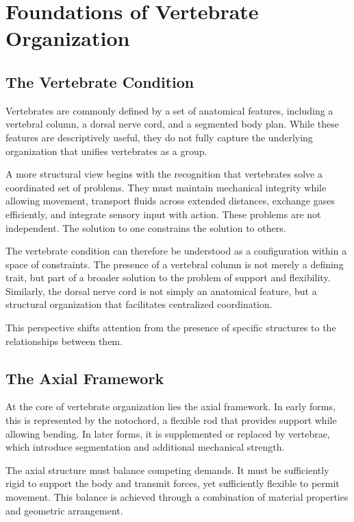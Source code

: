 \documentclass[11pt,oneside]{book}
\begin{document}
\mainmatter

\chapter{Foundations of Vertebrate Organization}

\section{The Vertebrate Condition}

Vertebrates are commonly defined by a set of anatomical features, including a vertebral column, a dorsal nerve cord, and a segmented body plan. While these features are descriptively useful, they do not fully capture the underlying organization that unifies vertebrates as a group.

A more structural view begins with the recognition that vertebrates solve a coordinated set of problems. They must maintain mechanical integrity while allowing movement, transport fluids across extended distances, exchange gases efficiently, and integrate sensory input with action. These problems are not independent. The solution to one constrains the solution to others.

The vertebrate condition can therefore be understood as a configuration within a space of constraints. The presence of a vertebral column is not merely a defining trait, but part of a broader solution to the problem of support and flexibility. Similarly, the dorsal nerve cord is not simply an anatomical feature, but a structural organization that facilitates centralized coordination.

This perspective shifts attention from the presence of specific structures to the relationships between them.

\section{The Axial Framework}

At the core of vertebrate organization lies the axial framework. In early forms, this is represented by the notochord, a flexible rod that provides support while allowing bending. In later forms, it is supplemented or replaced by vertebrae, which introduce segmentation and additional mechanical strength.

The axial structure must balance competing demands. It must be sufficiently rigid to support the body and transmit forces, yet sufficiently flexible to permit movement. This balance is achieved through a combination of material properties and geometric arrangement.
\end{document}
